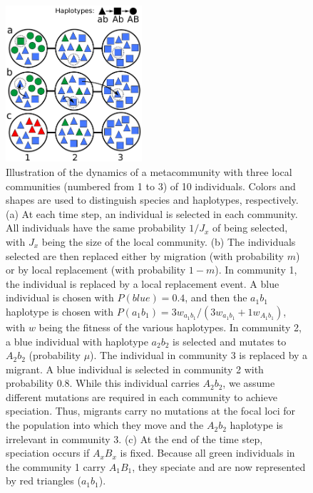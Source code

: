 \documentclass[letterpaper,twocolumn,superscriptaddress,showkeys]{revtex4}
\begin{document}
\begin{figure}[ht!]
\centering
\includegraphics[width=0.45\textwidth]{fig-model.pdf}
\caption{
Illustration of the dynamics of a metacommunity with three local communities (numbered from 1 to 3) of 10 individuals. Colors and shapes are used to distinguish species and haplotypes, respectively. (a) At each time step, an individual is selected in each community. All individuals have the same probability $1/J_x$ of being selected, with $J_x$ being the size of the local community. (b) The individuals selected are then replaced either by migration (with probability $m$) or by local replacement (with probability $1-m$). In community 1, the individual is replaced by a local replacement event. A blue individual is chosen with $P(blue) = 0.4$, and then the $a_1b_1$ haplotype is chosen with $P(a_1b_1) = 3w_{a_1b_1}/(3w_{a_1b_1} + 1w_{A_1b_1})$, with $w$ being the fitness of the various haplotypes. In community 2, a blue individual with haplotype $a_2b_2$ is selected and mutates to $A_2b_2$ (probability $\mu$). The individual in community 3 is replaced by a migrant. A blue individual is selected in community 2 with probability $0.8$. While this individual carries $A_2b_2$, we assume different mutations are required in each community to achieve speciation. Thus, migrants carry no mutations at the focal loci for the population into which they move and the $A_2b_2$ haplotype is irrelevant in community 3. (c) At the end of the time step, speciation occurs if $A_xB_x$ is fixed. Because all green individuals in the community 1 carry $A_1B_1$, they speciate and are now represented by red triangles ($a_1b_1$). 
}
\end{figure}
\end{document}
